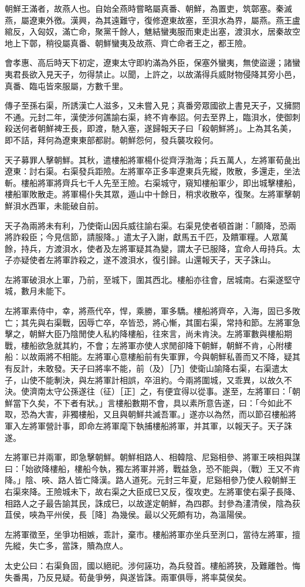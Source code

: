 
\begin{pinyinscope}
朝鮮王滿者，故燕人也。自始全燕時嘗略屬真番、朝鮮，為置吏，筑鄣塞。秦滅燕，屬遼東外徼。漢興，為其遠難守，復修遼東故塞，至浿水為界，屬燕。燕王盧綰反，入匈奴，滿亡命，聚黨千餘人，魋結蠻夷服而東走出塞，渡浿水，居秦故空地上下鄣，稍役屬真番、朝鮮蠻夷及故燕、齊亡命者王之，都王險。

會孝惠、高后時天下初定，遼東太守即約滿為外臣，保塞外蠻夷，無使盜邊；諸蠻夷君長欲入見天子，勿得禁止。以聞，上許之，以故滿得兵威財物侵降其旁小邑，真番、臨屯皆來服屬，方數千里。

傳子至孫右渠，所誘漢亡人滋多，又未嘗入見；真番旁眾國欲上書見天子，又擁閼不通。元封二年，漢使涉何譙諭右渠，終不肯奉詔。何去至界上，臨浿水，使御刺殺送何者朝鮮裨王長，即渡，馳入塞，遂歸報天子曰「殺朝鮮將」。上為其名美，即不詰，拜何為遼東東部都尉。朝鮮怨何，發兵襲攻殺何。

天子募罪人擊朝鮮。其秋，遣樓船將軍楊仆從齊浮渤海；兵五萬人，左將軍荀彘出遼東：討右渠。右渠發兵距險。左將軍卒正多率遼東兵先縱，敗散，多還走，坐法斬。樓船將軍將齊兵七千人先至王險。右渠城守，窺知樓船軍少，即出城擊樓船，樓船軍敗散走。將軍楊仆失其眾，遁山中十餘日，稍求收散卒，復聚。左將軍擊朝鮮浿水西軍，未能破自前。

天子為兩將未有利，乃使衛山因兵威往諭右渠。右渠見使者頓首謝：「願降，恐兩將詐殺臣；今見信節，請服降。」遣太子入謝，獻馬五千匹，及饋軍糧。人眾萬餘，持兵，方渡浿水，使者及左將軍疑其為變，謂太子已服降，宜命人毋持兵。太子亦疑使者左將軍詐殺之，遂不渡浿水，復引歸。山還報天子，天子誅山。

左將軍破浿水上軍，乃前，至城下，圍其西北。樓船亦往會，居城南。右渠遂堅守城，數月未能下。

左將軍素侍中，幸，將燕代卒，悍，乘勝，軍多驕。樓船將齊卒，入海，固已多敗亡；其先與右渠戰，因辱亡卒，卒皆恐，將心慚，其圍右渠，常持和節。左將軍急擊之，朝鮮大臣乃陰閒使人私約降樓船，往來言，尚未肯決。左將軍數與樓船期戰，樓船欲急就其約，不會；左將軍亦使人求閒卻降下朝鮮，朝鮮不肯，心附樓船：以故兩將不相能。左將軍心意樓船前有失軍罪，今與朝鮮私善而又不降，疑其有反計，未敢發。天子曰將率不能，前（及）［乃］使衛山諭降右渠，右渠遣太子，山使不能剸決，與左將軍計相誤，卒沮約。今兩將圍城，又乖異，以故久不決。使濟南太守公孫遂往（征）［正］之，有便宜得以從事。遂至，左將軍曰：「朝鮮當下久矣，不下者有狀。」言樓船數期不會，具以素所意告遂，曰：「今如此不取，恐為大害，非獨樓船，又且與朝鮮共滅吾軍。」遂亦以為然，而以節召樓船將軍入左將軍營計事，即命左將軍麾下執捕樓船將軍，并其軍，以報天子。天子誅遂。

左將軍已并兩軍，即急擊朝鮮。朝鮮相路人、相韓陰、尼谿相參、將軍王唊相與謀曰：「始欲降樓船，樓船今執，獨左將軍并將，戰益急，恐不能與，（戰）王又不肯降。」陰、唊、路人皆亡降漢。路人道死。元封三年夏，尼谿相參乃使人殺朝鮮王右渠來降。王險城未下，故右渠之大臣成巳又反，復攻吏。左將軍使右渠子長降、相路人之子最告諭其民，誅成巳，以故遂定朝鮮，為四郡。封參為澅清侯，陰為荻苴侯，唊為平州侯，長［降］為幾侯。最以父死頗有功，為溫陽侯。

左將軍徵至，坐爭功相嫉，乖計，棄市。樓船將軍亦坐兵至洌口，當待左將軍，擅先縱，失亡多，當誅，贖為庶人。

太史公曰：右渠負固，國以絕祀。涉何誣功，為兵發首。樓船將狹，及難離咎。悔失番禺，乃反見疑。荀彘爭勞，與遂皆誅。兩軍俱辱，將率莫侯矣。


\end{pinyinscope}